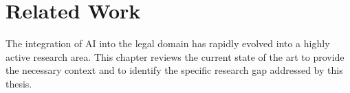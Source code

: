 \chapter{Related Work}
\label{ch:rw}

The integration of \ac{AI} into the legal domain has rapidly evolved into a highly active research area. This chapter reviews the current state of the art to provide the necessary context and to identify the specific research gap addressed by this thesis.







